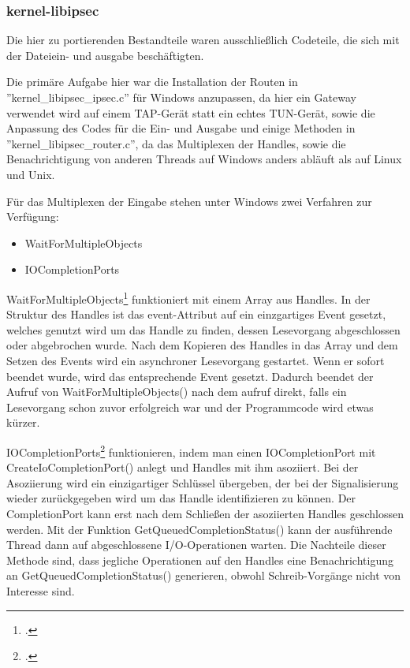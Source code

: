 \subsubsection{kernel-libipsec}
Die hier zu portierenden Bestandteile waren ausschließlich Codeteile, die
sich mit der Dateiein- und ausgabe beschäftigten.

Die primäre Aufgabe hier war die Installation der Routen in ''kernel\_libipsec\_ipsec.c''
für Windows anzupassen, da hier ein Gateway verwendet wird auf einem TAP-Gerät
statt ein echtes TUN-Gerät, sowie die Anpassung des Codes für die Ein- und Ausgabe 
und einige Methoden in
''kernel\_libipsec\_router.c'', da das Multiplexen der Handles, sowie die Benachrichtigung
von anderen Threads auf Windows anders abläuft als auf Linux und Unix.

Für das Multiplexen der Eingabe stehen unter Windows zwei Verfahren zur Verfügung:
\begin{itemize}
\item WaitForMultipleObjects
\item IOCompletionPorts
\end{itemize}

WaitForMultipleObjects\footcite[][]{_waitformultipleobjects_2016} funktioniert mit einem Array aus Handles. In der Struktur des Handles
ist das event-Attribut auf ein einzgartiges Event gesetzt, welches genutzt wird um
das Handle zu finden, dessen Lesevorgang abgeschlossen oder abgebrochen wurde.
Nach dem Kopieren des Handles in das Array und dem Setzen des Events wird ein asynchroner
Lesevorgang gestartet. Wenn er sofort beendet wurde, wird das entsprechende Event gesetzt.
Dadurch beendet der Aufruf von WaitForMultipleObjects() nach dem aufruf direkt, falls
ein Lesevorgang schon zuvor erfolgreich war und der Programmcode wird etwas kürzer.

IOCompletionPorts\footcite[][]{_createiocompletionport_2016} funktionieren, indem man einen IOCompletionPort mit CreateIoCompletionPort()
anlegt und Handles mit ihm asoziiert. Bei der Asoziierung wird ein einzigartiger Schlüssel
übergeben, der bei der Signalisierung wieder zurückgegeben wird um das Handle identifizieren zu können.
Der CompletionPort kann erst nach dem Schließen der asoziierten Handles geschlossen werden.
Mit der Funktion GetQueuedCompletionStatus() kann der ausführende Thread dann auf abgeschlossene
I/O-Operationen warten.
Die Nachteile dieser Methode sind, dass jegliche Operationen auf den Handles eine Benachrichtigung
an GetQueuedCompletionStatus() generieren, obwohl Schreib-Vorgänge nicht von Interesse sind.


